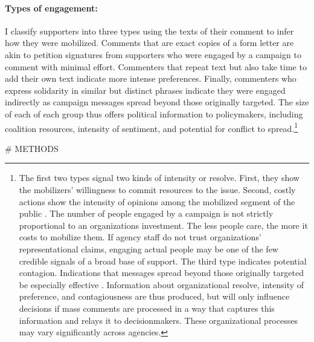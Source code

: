 


\paragraph{Types of engagement:} I classify supporters into three types using the texts of their comment to infer how they were mobilized.  Comments that are exact copies of a form letter are akin to petition signatures from supporters who were engaged by a campaign to comment with minimal effort. Commenters that repeat text but also take time to add their own text indicate more intense preferences. Finally, commenters who express solidarity in similar but distinct phrases indicate they were engaged indirectly
as campaign messages spread beyond those originally targeted. The size of each of each group thus offers political information to policymakers, including coalition resources, intensity of sentiment, and potential for conflict to spread.\footnote{
The first two types signal two kinds of intensity or resolve. First, they show the mobilizers' willingness to commit resources to the issue. Second, costly actions show the intensity of opinions among the mobilized segment of the public \citep{Dunleavy1991}. The number of people engaged by a campaign is not strictly proportional to an organizations investment. The less people care, the more it costs to mobilize them. If agency staff do not trust organizations' representational claims, engaging actual people may be one of the few credible signals of a broad base of support. The third type indicates potential contagion. Indications that messages spread beyond those originally targeted be especially effective \citep{Kollman1998}. Information about organizational resolve, intensity of preference, and contagiousness are thus produced, but will only influence decisions if mass comments are processed in a way that captures this information and relays it to decisionmakers. These organizational processes may vary significantly across agencies.
}


# METHODS 
